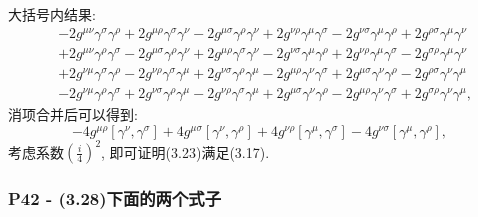 \documentclass[cn,hazy,green,11pt,device=normal,chinesefont=founder]{elegantnote}
\begin{document}
大括号内结果: 
\begin{equation}
  \begin{aligned}
    &- 2g^{\mu\nu}\gamma^\sigma \gamma^\rho + 2g^{\mu\rho}\gamma^\sigma \gamma^\nu - 2g^{\mu\sigma}\gamma^\rho \gamma^\nu + 2g^{\nu\rho}\gamma^\mu \gamma^\sigma - 2g^{\nu\sigma}\gamma^\mu \gamma^\rho + 2g^{\rho\sigma}\gamma^\mu \gamma^\nu \\
    &+ 2g^{\mu\nu}\gamma^\rho \gamma^\sigma - 2g^{\mu\sigma}\gamma^\rho \gamma^\nu + 2g^{\mu\rho}\gamma^\sigma \gamma^\nu - 2g^{\nu\sigma}\gamma^\mu \gamma^\rho + 2g^{\nu\rho}\gamma^\mu \gamma^\sigma - 2g^{\sigma\rho}\gamma^\mu \gamma^\nu \\
    &+ 2g^{\nu\mu}\gamma^\sigma \gamma^\rho - 2g^{\nu\rho}\gamma^\sigma \gamma^\mu + 2g^{\nu\sigma}\gamma^\rho \gamma^\mu - 2g^{\mu\rho}\gamma^\nu \gamma^\sigma + 2g^{\mu\sigma}\gamma^\nu \gamma^\rho - 2g^{\rho\sigma}\gamma^\nu \gamma^\mu \\
    &- 2g^{\nu\mu}\gamma^\rho \gamma^\sigma + 2g^{\nu\sigma}\gamma^\rho \gamma^\mu - 2g^{\nu\rho}\gamma^\sigma \gamma^\mu + 2g^{\mu\sigma}\gamma^\nu \gamma^\rho - 2g^{\mu\rho}\gamma^\nu \gamma^\sigma + 2g^{\sigma\rho}\gamma^\nu \gamma^\mu,  
  \end{aligned}
\end{equation}
消项合并后可以得到: 
\begin{equation}
  -4g^{\mu\rho}[\gamma^\nu, \gamma^\sigma] + 4g^{\mu\sigma}[\gamma^\nu, \gamma^\rho] + 4g^{\nu\rho}[\gamma^\mu, \gamma^\sigma] - 4g^{\nu\sigma}[\gamma^\mu, \gamma^\rho],  
\end{equation}
考虑系数$(\frac{i}{4})^2$, 即可证明(3.23)满足(3.17).

\subsubsection{P42 - (3.28)下面的两个式子}
\end{document}
